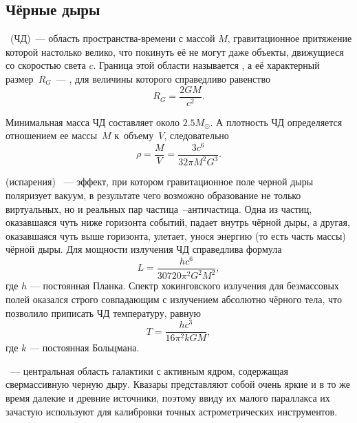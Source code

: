 \subsection{Чёрные дыры}
~(ЧД)~--- область пространства-времени с массой $M$, гравитационное притяжение которой настолько велико, что покинуть её не могут даже объекты, движущиеся со скоростью света $c$. Граница этой области называется , а её характерный размер~$R_G$~--- , для величины которого справедливо равенство
\begin{equation}
    R_G = \frac{2 G M}{c^2}.
\end{equation}

Минимальная масса ЧД составляет около $2.5M_{\odot}$. А плотность ЧД определяется отношением ее массы~$M$ к~объему~$V$, следовательно
\begin{equation}
    \rho = \frac{M}{V} = \frac{3c^6}{32\pi M^2G^3}.
\end{equation}

 (испарения) ~--- эффект, при котором гравитационное поле черной дыры поляризует вакуум, в результате чего возможно образование не только виртуальных, но и реальных пар частица~--античастица. Одна из частиц, оказавшаяся чуть ниже горизонта событий, падает внутрь чёрной дыры, а другая, оказавшаяся чуть выше горизонта, улетает, унося энергию (то есть часть массы) чёрной дыры. Для мощности излучения ЧД справедлива формула
\begin{equation}
    L = \frac{h c^6}{30720 \pi^2 G^2 M^2},
\end{equation}
где $h$ --- постоянная Планка. Спектр хокинговского излучения для безмассовых полей оказался строго совпадающим с излучением абсолютно чёрного тела, что позволило приписать ЧД температуру, равную
\begin{equation}
    T = \frac{h c^3}{16 \pi^2 k G M},
\end{equation}
где $k$ --- постоянная Больцмана.

~— центральная область галактики с активным ядром, содержащая свермассивную черную дыру. Квазары представляют собой очень яркие и в то же время далекие и древние источники, поэтому ввиду их малого параллакса их зачастую используют для калибровки точных астрометрических инструментов.


